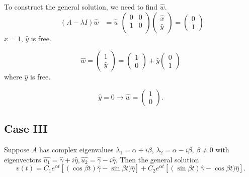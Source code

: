 \documentclass[12pt]{article}
\begin{document}
To construct the general solution, we need to find $\hat{w}$.
\begin{equation}
  \begin{aligned}
    (A-\lambda I)\hat{w}&=\hat{u}
  \end{aligned}
\begin{pmatrix}
    0 & 0 \\ 1 & 0 \\
  \end{pmatrix}
  \begin{pmatrix}
    \hat{x} \\ \hat{y}
  \end{pmatrix} =
  \begin{pmatrix}
    0 \\ 1
  \end{pmatrix}
\end{equation}
$\hat{x}=1$, $\hat{y}$ is free.

\begin{equation}
  \hat{w} =
  \begin{pmatrix}
    1 \\ \hat{y}
  \end{pmatrix} =
  \begin{pmatrix}
    1 \\ 0
  \end{pmatrix} +
  \hat{y}\begin{pmatrix}
    0 \\ 1
  \end{pmatrix}
\end{equation} where $\hat{y}$ is free.

\begin{equation}
  \hat{y} =0 \rightarrow \hat{w}=
  \begin{pmatrix}
    1 \\ 0
  \end{pmatrix}.
\end{equation}

\subsection{Case III}
Suppose $A$ has complex eigenvalues $\lambda_1=\alpha+i\beta$,
$\lambda_2=\alpha-i\beta$, $\beta\ne0$ with eigenvectors
$\hat{u_1}=\hat{\gamma}+i\hat{\eta}, \hat{u_2}=\hat{\gamma}-i\hat{\eta}$. Then
the general solution
\begin{equation}
  v(t) = C_1e^{\alpha t}[(\cos\beta t)\hat{\gamma} - \sin\beta t)\hat{\eta}] +
  C_2e^{\alpha t}[(\sin\beta t)\hat{\gamma} - \cos\beta t)\hat{\eta}].
\end{equation}
\end{document}
